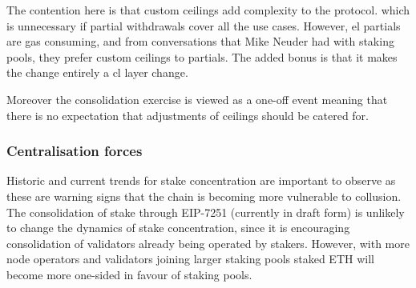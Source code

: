 The contention here is that custom ceilings add complexity to the protocol. which is unnecessary if partial withdrawals cover all the use cases.  However, \gls{el} partials are gas consuming, and from conversations that Mike Neuder had with staking pools, they prefer custom ceilings to partials. The added bonus is that it makes the change entirely a \gls{cl}  layer change.

Moreover the consolidation exercise is viewed as a one-off event meaning that there is no expectation that adjustments of ceilings should be catered for.

\subsubsection{Centralisation forces}
Historic and current trends for stake concentration are important to observe as these are warning signs that the chain is becoming more vulnerable to collusion. The consolidation of stake through EIP-7251 (currently in draft form) \cite{Neuder2023c} is unlikely to change the dynamics of stake concentration, since it is encouraging consolidation of validators already being operated by stakers. However, with more node operators and validators joining larger staking pools staked ETH will become more one-sided in favour of staking pools. 
